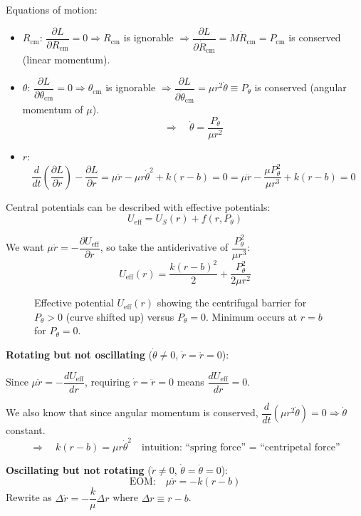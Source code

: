Equations of motion:
\begin{itemize}
    \item $R_\text{cm}$: $\dfrac{\partial L}{\partial R_\text{cm}} = 0 \Rightarrow R_\text{cm}$ is ignorable $\Rightarrow \dfrac{\partial L}{\partial \dot R_\text{cm}} = M\dot R_\text{cm} = P_\text{cm}$ is conserved (linear momentum).

    \item $\theta$: $\dfrac{\partial L}{\partial \theta_\text{cm}} = 0 \Rightarrow \theta_\text{cm}$ is ignorable $\Rightarrow \dfrac{\partial L}{\partial \dot\theta_\text{cm}} = \mu r^2\dot\theta \equiv P_\theta$ is conserved (angular momentum of $\mu$).
    \[
        \Rightarrow\quad \dot\theta = \frac{P_\theta}{\mu r^2}
    \]

    \item $r$:
    \[
        \frac{d}{dt}\left(\frac{\partial L}{\partial \dot r}\right) - \frac{\partial L}{\partial r}
        = \mu\ddot{r} - \mu r\dot\theta^2 + k(r-b) = 0
        = \mu\ddot{r} - \frac{\mu P_\theta^2}{\mu r^3} + k(r-b) = 0
    \]
\end{itemize}

Central potentials can be described with effective potentials:
\[
    U_\text{eff} = U_S(r) + f(r, P_\theta)
\]

We want $\mu\ddot{r} = -\dfrac{\partial U_\text{eff}}{\partial r}$, so take the antiderivative of $\dfrac{P_\theta^2}{\mu r^3}$:
\[
    U_\text{eff}(r) = \frac{k(r-b)^2}{2} + \frac{P_\theta^2}{2\mu r^2}
\]

\begin{figure}[H]
\centering
\caption{Effective potential $U_\text{eff}(r)$ showing the centrifugal barrier for $P_\theta > 0$ (curve shifted up) versus $P_\theta = 0$. Minimum occurs at $r = b$ for $P_\theta = 0$.}
\end{figure}

\textbf{Rotating but not oscillating} ($\dot\theta \neq 0$, $\dot r = \ddot r = 0$):

Since $\mu\ddot{r} = -\dfrac{dU_\text{eff}}{dr}$, requiring $\dot r = \ddot r = 0$ means $\dfrac{dU_\text{eff}}{dr} = 0$.

We also know that since angular momentum is conserved, $\dfrac{d}{dt}(\mu r^2 \dot\theta) = 0 \Rightarrow \dot\theta$ constant.
\[
    \Rightarrow\quad k(r-b) = \mu r\dot\theta^2
    \quad \text{intuition: ``spring force'' = ``centripetal force''}
\]

\textbf{Oscillating but not rotating} ($\ddot r \neq 0$, $\dot\theta = \ddot\theta = 0$):
\[
    \text{EOM:}\quad \mu\ddot{r} = -k(r-b)
\]
Rewrite as $\Delta\ddot{r} = -\dfrac{k}{\mu}\Delta r$ where $\Delta r \equiv r - b$.

